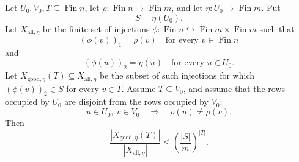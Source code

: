 \begin{helper}
Let \(U_0,V_0,T\subseteq\operatorname{Fin}n\), let
\(\rho:\operatorname{Fin}n\to\operatorname{Fin}m\), and let
\(\eta:U_0\to\operatorname{Fin}m\).  Put
\[
S=\eta(U_0).
\]
Let \(X_{\mathrm{all},\eta}\) be the finite set of injections
\(\phi:\operatorname{Fin}n\hookrightarrow
\operatorname{Fin}m\times\operatorname{Fin}m\) such that
\[
(\phi(v))_1=\rho(v)\quad\text{for every }v\in\operatorname{Fin}n
\]
and
\[
(\phi(u))_2=\eta(u)\quad\text{for every }u\in U_0.
\]
Let \(X_{\mathrm{good},\eta}(T)\subseteq X_{\mathrm{all},\eta}\) be the
subset of such injections for which \((\phi(v))_2\in S\) for every
\(v\in T\).  Assume \(T\subseteq V_0\), and assume that the rows occupied by
\(U_0\) are disjoint from the rows occupied by \(V_0\):
\[
u\in U_0,\ v\in V_0\quad\Longrightarrow\quad \rho(u)\ne\rho(v).
\]
Then
\[
\frac{|X_{\mathrm{good},\eta}(T)|}{|X_{\mathrm{all},\eta}|}
\le
\left(\frac{|S|}{m}\right)^{|T|}.
\]
\end{helper}
